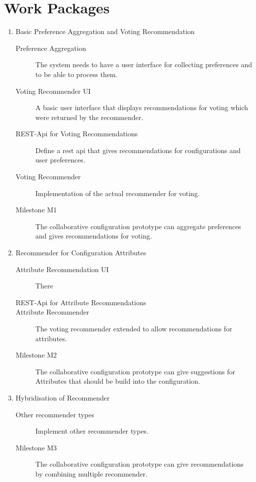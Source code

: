 \section{Work Packages}
\label{sec:Organisation:WorkPackages}

\begin{enumerate}[label=Work Package \arabic*:, align=left]
    \item Basic Preference Aggregation and Voting Recommendation
        \begin{description}
            \item[Preference Aggregation] The system needs to have a user interface for collecting preferences and to be able to process them.
            \item[Voting Recommender UI] A basic user interface that displays recommendations for voting which were returned by the recommender.
            \item[REST-Api for Voting Recommendations] Define a rest api that gives recommendations for configurations and user preferences.
            \item[Voting Recommender] Implementation of the actual recommender for voting.
            \item[Milestone M1] The collaborative configuration prototype can aggregate preferences and gives recommendations for voting.
        \end{description}
    \pagebreak[3]
    \item Recommender for Configuration Attributes
    \begin{description}
        \item[Attribute Recommendation UI] There 
        \item[REST-Api for Attribute Recommendations]
        \item[Attribute Recommender] The voting recommender extended to allow recommendations for attributes.
        \item[Milestone M2] The collaborative configuration prototype can give suggestions for Attributes that should be build into the configuration. 
    \end{description}
    \pagebreak[3]
    \item Hybridisation of Recommender
    \begin{description}
        \item[Other recommender types] Implement other recommender types. 
        \item[Milestone M3] The collaborative configuration prototype can give recommendations by combining multiple recommender.
    \end{description}
    \pagebreak[3]
\end{enumerate}

